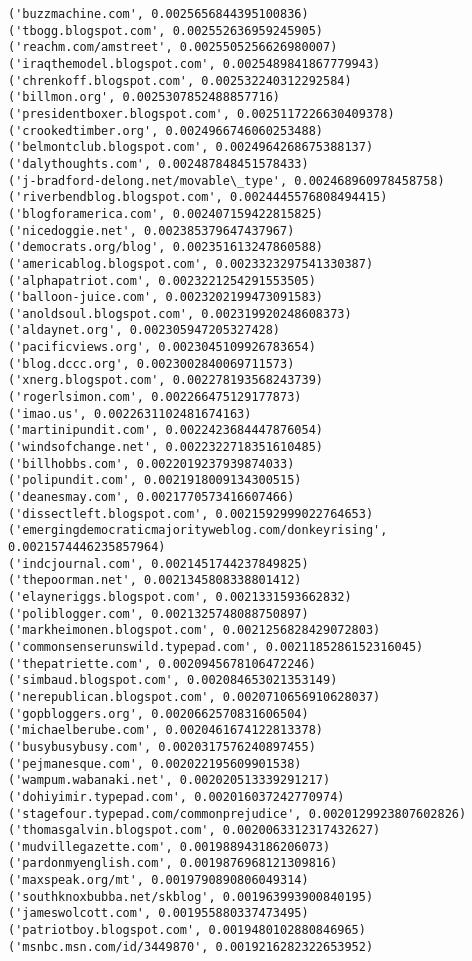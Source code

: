 \documentclass[11pt]{article}
\begin{document}
\begin{Verbatim}[commandchars=\\\{\}]
('buzzmachine.com', 0.0025656844395100836)
('tbogg.blogspot.com', 0.002552636959245905)
('reachm.com/amstreet', 0.0025505256626980007)
('iraqthemodel.blogspot.com', 0.0025489841867779943)
('chrenkoff.blogspot.com', 0.002532240312292584)
('billmon.org', 0.0025307852488857716)
('presidentboxer.blogspot.com', 0.0025117226630409378)
('crookedtimber.org', 0.0024966746060253488)
('belmontclub.blogspot.com', 0.0024964268675388137)
('dalythoughts.com', 0.002487848451578433)
('j-bradford-delong.net/movable\_type', 0.002468960978458758)
('riverbendblog.blogspot.com', 0.0024445576808494415)
('blogforamerica.com', 0.002407159422815825)
('nicedoggie.net', 0.002385379647437967)
('democrats.org/blog', 0.002351613247860588)
('americablog.blogspot.com', 0.0023323297541330387)
('alphapatriot.com', 0.0023221254291553505)
('balloon-juice.com', 0.0023202199473091583)
('anoldsoul.blogspot.com', 0.002319920248608373)
('aldaynet.org', 0.002305947205327428)
('pacificviews.org', 0.0023045109926783654)
('blog.dccc.org', 0.0023002840069711573)
('xnerg.blogspot.com', 0.002278193568243739)
('rogerlsimon.com', 0.002266475129177873)
('imao.us', 0.0022631102481674163)
('martinipundit.com', 0.0022423684447876054)
('windsofchange.net', 0.0022322718351610485)
('billhobbs.com', 0.0022019237939874033)
('polipundit.com', 0.0021918009134300515)
('deanesmay.com', 0.0021770573416607466)
('dissectleft.blogspot.com', 0.0021592999022764653)
('emergingdemocraticmajorityweblog.com/donkeyrising', 0.0021574446235857964)
('indcjournal.com', 0.0021451744237849825)
('thepoorman.net', 0.0021345808338801412)
('elayneriggs.blogspot.com', 0.0021331593662832)
('poliblogger.com', 0.0021325748088750897)
('markheimonen.blogspot.com', 0.0021256828429072803)
('commonsenserunswild.typepad.com', 0.0021185286152316045)
('thepatriette.com', 0.0020945678106472246)
('simbaud.blogspot.com', 0.002084653021353149)
('nerepublican.blogspot.com', 0.0020710656910628037)
('gopbloggers.org', 0.0020662570831606504)
('michaelberube.com', 0.0020461674122813378)
('busybusybusy.com', 0.0020317576240897455)
('pejmanesque.com', 0.002022195609901538)
('wampum.wabanaki.net', 0.002020513339291217)
('dohiyimir.typepad.com', 0.002016037242770974)
('stagefour.typepad.com/commonprejudice', 0.0020129923807602826)
('thomasgalvin.blogspot.com', 0.0020063312317432627)
('mudvillegazette.com', 0.001988943186206073)
('pardonmyenglish.com', 0.0019876968121309816)
('maxspeak.org/mt', 0.0019790890806049314)
('southknoxbubba.net/skblog', 0.001963993900840195)
('jameswolcott.com', 0.001955880337473495)
('patriotboy.blogspot.com', 0.0019480102880846965)
('msnbc.msn.com/id/3449870', 0.0019216282322653952)

\end{Verbatim}
\end{document}

